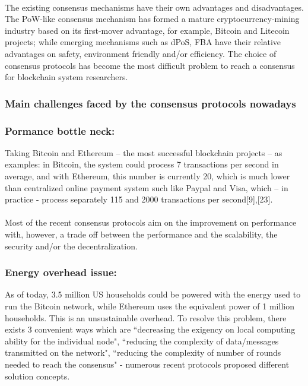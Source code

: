 \documentclass[]{article}
\begin{document}
\begin{CJK*}{UTF8}{gbsn}
\paragraph{} The existing consensus mechanisms have their own advantages and disadvantages. The PoW-like consensus mechanism has formed a mature cryptocurrency-mining industry based on its first-mover advantage, for example, Bitcoin and Litecoin projects; while emerging mechanisms such as dPoS, FBA have their relative advantages on safety, environment friendly and/or efficiency. The choice of consensus protocols has become the most difficult problem to reach a consensus for blockchain system researchers.
\subsubsection{Main challenges faced by the consensus protocols nowadays}
\subsubsection*{Pormance bottle neck: }
Taking Bitcoin and Ethereum – the most successful blockchain projects – as examples: in Bitcoin, the system could process 7 transactions per second in average, and with Ethereum, this number is currently 20, which is much lower than centralized online payment system such like Paypal and Visa, which – in practice -  process separately 115 and 2000 transactions per second[9],[23].
\paragraph{}
	Most of the recent consensus protocols aim on the improvement on performance with, however, a trade off between the performance and the scalability, the security and/or the decentralization. 
\subsubsection*{Energy overhead issue:}	 As of today, 3.5 million US households could be powered with the energy used to run the Bitcoin network, while Ethereum uses the equivalent power of 1 million households. This is an unsustainable overhead. To resolve this problem, there exists 3 convenient ways which are ``decreasing the exigency on local computing ability for the individual node", ``reducing the complexity of data/messages transmitted on the network", ``reducing the complexity of number of rounds needed to reach the consensus" - numerous recent protocols proposed different solution concepts.

\end{CJK*}
\end{document}
